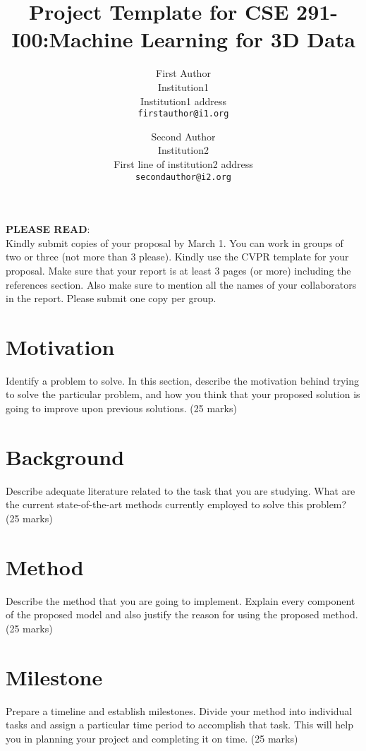 \documentclass[10pt,twocolumn,letterpaper]{article}
\begin{document}
\title{Project Template for CSE 291-I00:Machine Learning for 3D Data}

\author{First Author\\
Institution1\\
Institution1 address\\
{\tt\small firstauthor@i1.org}
\and
Second Author\\
Institution2\\
First line of institution2 address\\
{\tt\small secondauthor@i2.org}
}

\maketitle
\textbf{PLEASE READ}: \\
Kindly submit copies of your proposal by March 1. You can work in groups of two or three (not more than 3 please). Kindly use the CVPR template for your proposal. Make sure that your report is at least 3 pages (or more) including the references section. Also make sure to mention all the names of your collaborators in the report. Please submit one copy per group.
\section{Motivation}
Identify a problem to solve. In this section, describe the motivation behind trying to solve the particular problem, and how you think that your proposed solution is going to improve upon previous solutions. (25 marks)
\section{Background}
Describe adequate literature related to the task that you are studying. What are the current state-of-the-art methods currently employed to solve this problem? (25 marks)
\section{Method}
Describe the method that you are going to implement. Explain every component of the proposed model and also justify the reason for using the proposed method. (25 marks)
\section{Milestone}
Prepare a timeline and establish milestones. Divide your method into individual tasks and assign a particular time period to accomplish that task. This will help you in planning your project and completing it on time. (25 marks) 
{\small


}
\end{document}
